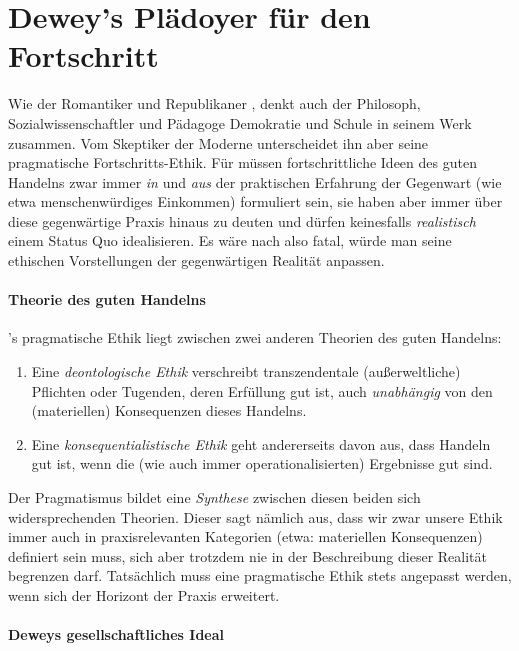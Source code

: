 \section[Epilog]{Dewey's Plädoyer für den Fortschritt}

Wie der Romantiker und Republikaner \citeauthor{rousseau-1762}, denkt auch der Philosoph, Sozialwissenschaftler und Pädagoge \citeauthor{Dewey2010} Demokratie und Schule in seinem Werk zusammen.
Vom Skeptiker der Moderne \citeauthor{Rousseau-1762-b} unterscheidet ihn aber seine pragmatische Fortschritts-Ethik.
Für \citeauthor{Dewey2010} müssen fortschrittliche Ideen des guten Handelns zwar immer \emph{in} und \emph{aus} der praktischen Erfahrung der Gegenwart (wie etwa menschenwürdiges Einkommen) formuliert sein, sie haben aber immer über diese gegenwärtige Praxis hinaus zu deuten und dürfen keinesfalls \emph{realistisch} einem Status Quo idealisieren.
Es wäre nach \citeauthor{Dewey2010} also fatal, würde man seine ethischen Vorstellungen der gegenwärtigen Realität anpassen.


\paragraph{Theorie des guten Handelns}

\citeauthor{Dewey1932}'s pragmatische Ethik liegt zwischen zwei anderen Theorien des guten Handelns:

\begin{enumerate}
	\item Eine \emph{deontologische Ethik} verschreibt transzendentale (außerweltliche) Pflichten oder Tugenden, deren Erfüllung gut ist, auch \emph{unabhängig} von den (materiellen) Konsequenzen dieses Handelns.
	\item Eine \emph{konsequentialistische Ethik} geht andererseits davon aus, dass Handeln gut ist, wenn die (wie auch immer operationalisierten) Ergebnisse gut sind.
\end{enumerate}

Der Pragmatismus bildet eine \emph{Synthese} zwischen diesen beiden sich widersprechenden Theorien.
Dieser sagt nämlich aus, dass wir zwar unsere Ethik immer auch in praxisrelevanten Kategorien (etwa: materiellen Konsequenzen) definiert sein muss, sich aber trotzdem nie in der Beschreibung dieser Realität begrenzen darf.
Tatsächlich muss eine pragmatische Ethik stets angepasst werden, wenn sich der Horizont der Praxis erweitert.


\paragraph{Deweys gesellschaftliches Ideal}

